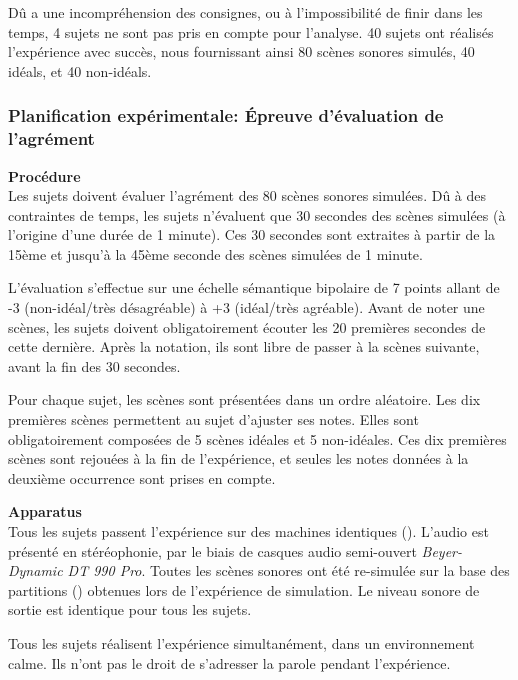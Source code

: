 Dû a une incompréhension des consignes, ou à l'impossibilité de finir dans les temps, 4 sujets ne sont pas pris en compte pour l'analyse. 40 sujets ont réalisés l'expérience avec succès, nous fournissant ainsi 80 scènes sonores simulés, 40 idéals, et 40 non-idéals.

\subsubsection{Planification expérimentale: Épreuve d'évaluation de l'agrément}

\textbf{Procédure} \\

Les sujets doivent évaluer l'agrément des 80 scènes sonores simulées. Dû à des contraintes de temps, les sujets n'évaluent que 30 secondes des scènes simulées (à l'origine d'une durée de 1 minute). Ces 30 secondes sont extraites à partir de la 15ème et jusqu'à la 45ème seconde des scènes simulées de 1 minute.

L'évaluation s'effectue sur une échelle sémantique bipolaire de 7 points allant de -3 (non-idéal/très désagréable) à +3 (idéal/très agréable). Avant de noter une scènes, les sujets doivent obligatoirement écouter les 20 premières secondes de cette dernière. Après la notation, ils sont libre de passer à la scènes suivante, avant la fin des 30 secondes.

Pour chaque sujet, les scènes sont présentées dans un ordre aléatoire. Les dix premières scènes permettent au sujet d'ajuster ses notes. Elles sont obligatoirement composées de 5 scènes idéales et 5 non-idéales. Ces dix premières scènes sont rejouées à la fin de l'expérience, et seules les notes données à la deuxième occurrence sont prises en compte.

\textbf{Apparatus} \\

Tous les sujets passent l'expérience sur des machines identiques (). L'audio est présenté en stéréophonie, par le biais de casques audio semi-ouvert \emph{Beyer-Dynamic DT 990 Pro}. Toutes les scènes sonores ont été re-simulée sur la base des partitions () obtenues lors de l'expérience de simulation. Le niveau sonore de sortie est identique pour tous les sujets.

Tous les sujets réalisent l'expérience simultanément, dans un environnement calme. Ils n'ont pas le droit de s'adresser la parole pendant l'expérience.

